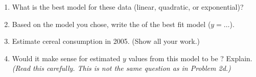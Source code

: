 \begin{minipage}{0.7\textwidth}
    \begin{enumerate}[label=(\alph*)]
        \item What is the best model for these data (linear, quadratic, or exponential)?
            \vspace{1\onelineskip}
        \item Based on the model you chose, write the  of the best fit model ($y = \dots$).
        \vspace{1\onelineskip}
        \item Estimate cereal consumption in 2005. (Show all your work.)
        \vspace{3\onelineskip}
        \item Would it make sense for estimated $y$ values from this model to be ?
            Explain. 
            {\itshape(Read this carefully. This is not the same question as in Problem 2d.)}
        \vspace{5\onelineskip}
    \end{enumerate}
\end{minipage}
